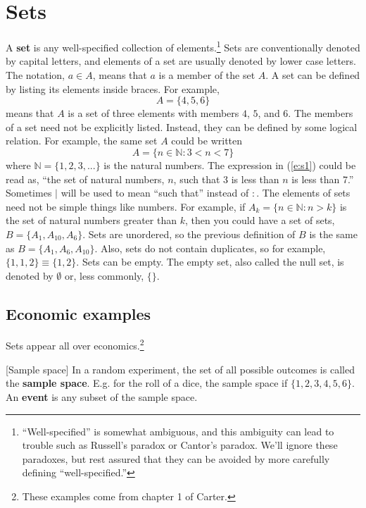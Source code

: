 \section{Sets \label{s:sets}} 

A \textbf{set} is any well-specified collection of
elements.\footnote{``Well-specified'' is somewhat ambiguous, and this
  ambiguity can lead to trouble such as Russell's paradox or Cantor's
  paradox. We'll ignore these paradoxes, but rest assured that they
  can be avoided by more carefully defining ``well-specified.''
} Sets are conventionally denoted by capital letters, and
elements of a set are usually denoted by lower case letters. The
notation, $a \in A$, means that $a$ is a member of the set $A$. A set
can be defined by listing its elements inside braces. For example,
\[ A = \{ 4, 5, 6 \} \]
means that $A$ is a set of three elements with members $4$, $5$, and
$6$. The members of a set need not be explicitly listed. Instead, they
can be defined by some logical relation. For example, the same set $A$
could be written
\begin{equation}
  A = \{ n \in \mathbb{N} : 3 < n < 7 \}  \label{e:s1}
\end{equation}
where $\mathbb{N} = \{1, 2, 3, ... \}$ is the natural numbers. The
expression in (\ref{e:s1}) could be read as, ``the set of natural
numbers, $n$, such that 3 is less than $n$ is less than 7.''
Sometimes $|$ will be used to mean ``such that'' instead of $:$. The
elements of sets need not be simple things like numbers. For example,
if $A_k = \{ n \in \mathbb{N}: n > k \}$ is the set of natural numbers
greater than $k$, then you could have a set of sets, $B = \{ A_1,
A_{10}, A_{6} \}$.  Sets are unordered, so the previous definition of
$B$ is the same as $B = \{ A_1, A_6, A_{10} \}$. Also, sets do not
contain duplicates, so for example, $\{ 1, 1, 2 \} \equiv \{1, 2
\}$. Sets can be empty. The empty set, also called the null set, is
denoted by $\emptyset$ or, less commonly, $\{ \}$.

\subsection{Economic examples}


Sets appear all over economics.\footnote{These examples come
from chapter 1 of Carter.} 
\begin{example}\label{ex:sampleSpace}[Sample space]
  In a random experiment, the set of all possible outcomes is called
  the \textbf{sample space}. E.g. for the roll of a dice, the sample
  space if $\{1,2 ,3 , 4, 5, 6\}$. An \textbf{event} is any subset of
  the sample space.
\end{example}

